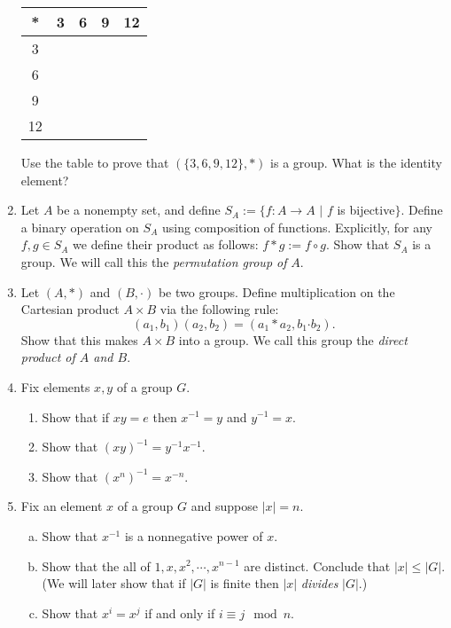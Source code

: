 \documentclass[11pt]{article}
\begin{document}
\begin{enumerate}
	      \begin{center}
		      \begin{tabular}{c|c|c|c|c}
			      *  & 3 & 6 & 9 & 12 \\
			      \hline
			      3  &   &   &   &    \\
			      \hline
			      6  &   &   &   &    \\
			      \hline
			      9  &   &   &   &    \\
			      \hline
			      12 &   &   &   &
		      \end{tabular}
	      \end{center}
	      Use the table to prove that $\left(\{3,6,9,12\},*\right)$ is a group.  What is the identity element?
	\item Let $A$ be a nonempty set, and define $S_A:=\{f:A\to A$ $|$ $f$ is bijective$\}$.  Define a binary operation  on $S_A$ using composition of functions.   Explicitly, for any $f,g\in S_A$ we define their product as follows: $f*g := f\circ g$.  Show that $S_A$ is a group.  We will call this the \textit{permutation group of }$A$.
  \item{
  Let $(A,*)$ and $(B,\boldsymbol{\cdot})$ be two groups.  Define multiplication on the Cartesian product $A\times B$ via the following rule:
  \[(a_1,b_1)(a_2,b_2) = (a_1*a_2,b_1\boldsymbol{\cdot}b_2).\]
  Show that this makes $A\times B$ into a group.  We call this group the \textit{direct product of $A$ and $B$}.
  }
	\item{
  Fix elements $x,y$ of a group $G$.
  \begin{enumerate}
    \item{
    Show that if $xy=e$ then $x^{-1}=y$ and $y^{-1}=x$.
    }
    \item{
    Show that $(xy)^{-1} = y^{-1}x^{-1}$.
    }
    \item{
    Show that $(x^n)^{-1} = x^{-n}$.
    }
  \end{enumerate}
  }
	\item Fix an element $x$ of a group $G$ and suppose $|x| = n$.
  \begin{enumerate}[(a)]
    \item Show that $x^{-1}$ is a nonnegative power of $x$.
		\item Show that the all of $1,x,x^2,\cdots,x^{n-1}$ are distinct.  Conclude that $|x|\le|G|$.  (We will later show that if $|G|$ is finite then $|x|$ \textit{divides} $|G|$.)
		\item Show that $x^i=x^j$ if and only if $i\equiv j\mod n$.
	\end{enumerate}
 \end{enumerate}
\end{document}
